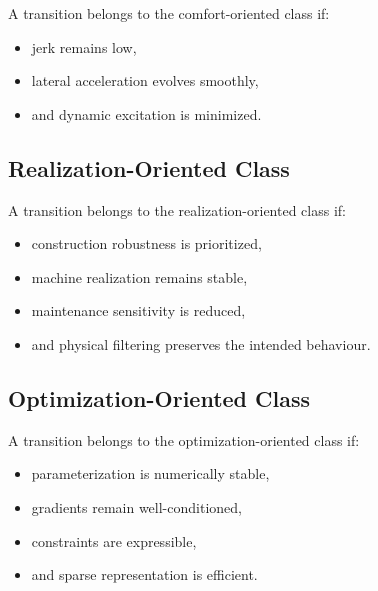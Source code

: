 \begin{definition}
\label{def:comfort-oriented-class}
A transition belongs to the comfort-oriented class if:
\begin{itemize}
\item jerk remains low,
\item lateral acceleration evolves smoothly,
\item and dynamic excitation is minimized.
\end{itemize}
\end{definition}


\subsection{Realization-Oriented Class}

\begin{definition}
\label{def:realization-oriented-class}
A transition belongs to the realization-oriented class if:
\begin{itemize}
\item construction robustness is prioritized,
\item machine realization remains stable,
\item maintenance sensitivity is reduced,
\item and physical filtering preserves the intended behaviour.
\end{itemize}
\end{definition}


\subsection{Optimization-Oriented Class}

\begin{definition}
\label{def:optimization-oriented-class}
A transition belongs to the optimization-oriented class if:
\begin{itemize}
\item parameterization is numerically stable,
\item gradients remain well-conditioned,
\item constraints are expressible,
\item and sparse representation is efficient.
\end{itemize}
\end{definition}

